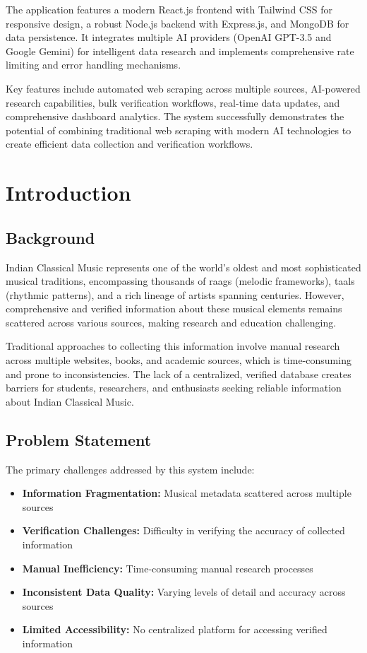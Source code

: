 \documentclass[12pt,a4paper]{article}
\begin{document}
The application features a modern React.js frontend with Tailwind CSS for responsive design, a robust Node.js backend with Express.js, and MongoDB for data persistence. It integrates multiple AI providers (OpenAI GPT-3.5 and Google Gemini) for intelligent data research and implements comprehensive rate limiting and error handling mechanisms.

Key features include automated web scraping across multiple sources, AI-powered research capabilities, bulk verification workflows, real-time data updates, and comprehensive dashboard analytics. The system successfully demonstrates the potential of combining traditional web scraping with modern AI technologies to create efficient data collection and verification workflows.

\section{Introduction}

\subsection{Background}

Indian Classical Music represents one of the world's oldest and most sophisticated musical traditions, encompassing thousands of raags (melodic frameworks), taals (rhythmic patterns), and a rich lineage of artists spanning centuries. However, comprehensive and verified information about these musical elements remains scattered across various sources, making research and education challenging.

Traditional approaches to collecting this information involve manual research across multiple websites, books, and academic sources, which is time-consuming and prone to inconsistencies. The lack of a centralized, verified database creates barriers for students, researchers, and enthusiasts seeking reliable information about Indian Classical Music.

\subsection{Problem Statement}

The primary challenges addressed by this system include:

\begin{itemize}
    \item \textbf{Information Fragmentation:} Musical metadata scattered across multiple sources
    \item \textbf{Verification Challenges:} Difficulty in verifying the accuracy of collected information
    \item \textbf{Manual Inefficiency:} Time-consuming manual research processes
    \item \textbf{Inconsistent Data Quality:} Varying levels of detail and accuracy across sources
    \item \textbf{Limited Accessibility:} No centralized platform for accessing verified information
\end{itemize}
\end{document}
